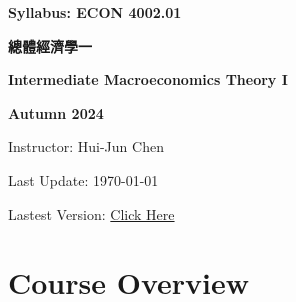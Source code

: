 \documentclass[12pt]{article}
\begin{document}
\centerline{\huge\bf Syllabus: ECON 4002.01}
\medskip
\centerline{\LARGE \bf 總體經濟學一 }
\centerline{\LARGE \bf Intermediate Macroeconomics Theory I}
\medskip
\centerline{\LARGE \bf Autumn 2024}
\medskip
\centerline{\Large Instructor: Hui-Jun Chen}
\centerline{Last Update: \today}
\centerline{Lastest Version: \href{https://huijunchen9260.github.io/pdf/IntermediateMacroAutumn2024/syllabus/build/syllabus.pdf}{Click Here}}

\medskip

\tableofcontents

\section*{Course Overview}
\begin{itemize}


\end{itemize}
\end{document}
